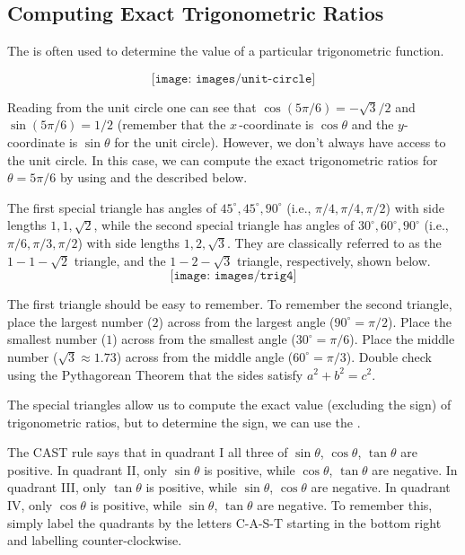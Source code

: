 \subsection{Computing Exact Trigonometric Ratios}
The  is often used to determine the  value of a particular trigonometric function.

$$\texttt{[image: images/unit-circle]}$$

Reading from the unit circle one can see that $\cos (5\pi/6)=-\sqrt 3/2$ and $\sin (5\pi/6)=1/2$ (remember that the $x\,$-coordinate is $\cos\theta$ and the $y$-coordinate is $\sin\theta$ for the unit circle).
However, we don't always have access to the unit circle.
In this case, we can compute the exact trigonometric ratios for $\theta=5\pi/6$ by using  and the  described below.

The first special triangle has angles of $45^\circ,45^\circ,90^\circ$ (i.e., $\pi/4,\pi/4,\pi/2$) with side lengths $1,1,\sqrt 2$, while the second special triangle has angles of $30^\circ,60^\circ,90^\circ$ (i.e., $\pi/6,\pi/3,\pi/2$) with side lengths $1,2,\sqrt 3$. They are classically referred to as the $1-1-\sqrt{2}$ triangle, and the $1-2-\sqrt{3}$ triangle, respectively, shown below.
$$\texttt{[image: images/trig4]}$$

\begin{formulabox}[Mnemonic]
The first triangle should be easy to remember. 
To remember the second triangle, place the largest number ($2$) across from the largest angle ($90^\circ=\pi/2$).
Place the smallest number ($1$) across from the smallest angle ($30^\circ=\pi/6$).
Place the middle number ($\sqrt 3\approx 1.73$) across from the middle angle ($60^\circ=\pi/3$).
Double check using the Pythagorean Theorem that the sides satisfy $a^2+b^2=c^2$.
\end{formulabox}

The special triangles allow us to compute the exact value (excluding the sign) of trigonometric ratios, but to determine the sign, we can use the .

\begin{formulabox}
The CAST rule says that in quadrant I all three of $\sin\theta$, $\cos\theta$, $\tan\theta$ are positive.
In quadrant II, only $\sin\theta$ is positive, while $\cos\theta$, $\tan\theta$ are negative.
In quadrant III, only $\tan\theta$ is positive, while $\sin\theta$, $\cos\theta$ are negative.
In quadrant IV, only $\cos\theta$ is positive, while $\sin\theta$, $\tan\theta$ are negative. 
To remember this, simply label the quadrants by the letters C-A-S-T starting in the bottom right and labelling counter-clockwise.
\end{formulabox} 

